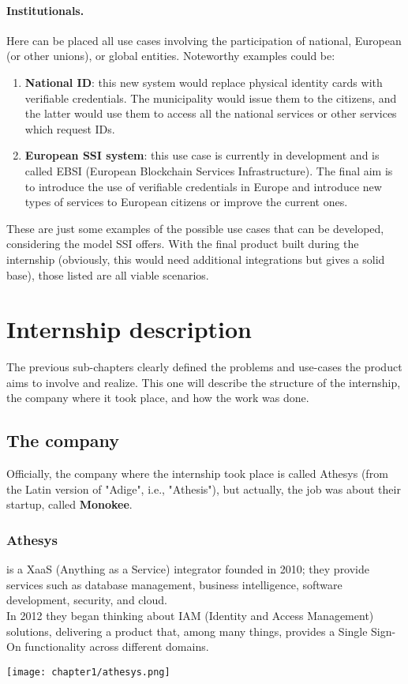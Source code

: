 \paragraph{Institutionals.}
Here can be placed all use cases involving the participation of national, 
European (or other unions), or global entities.
Noteworthy examples could be:
\begin{enumerate}
    \item \textbf{National ID}: this new system would replace physical identity 
    cards with verifiable credentials. The municipality would issue them to the 
    citizens, and the latter would use them to access all the national services 
    or other services which request IDs.
    \item \textbf{European SSI system}: this use case is currently in development 
    and is called EBSI (European Blockchain Services Infrastructure). The final 
    aim is to introduce the use of verifiable credentials in Europe and introduce 
    new types of services to European citizens or improve the current 
    ones\cite{site:ebsi}.
\end{enumerate}
\vspace*{0.3cm}
These are just some examples of the possible use cases that can be developed, 
considering the model SSI offers.
With the final product built during the internship (obviously, this would need 
additional integrations but gives a solid base), those listed are all viable 
scenarios.
\section{Internship description}
The previous sub-chapters clearly defined the problems and use-cases the product 
aims to involve and realize. This one will describe the structure of the internship, 
the company where it took place, and how the work was done.
\subsection{The company}
Officially, the company where the internship took place is 
called Athesys (from the Latin version of "Adige", i.e., "Athesis"), but actually, 
the job was about their startup, called \textbf{Monokee}.
    \subsubsection{Athesys} is a XaaS (Anything as a Service) integrator founded 
    in 2010; they provide     services such as database management, business 
    intelligence, software development, security, and cloud.\\
    In 2012 they began thinking about IAM (Identity and Access Management) solutions, 
    delivering a product that, among many things, provides a Single Sign-On 
    functionality across different domains.
    \begin{center}
        \texttt{[image: chapter1/athesys.png]}
    \end{center}

